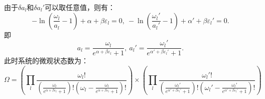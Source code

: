 \documentclass[a4paper,12pt]{article}
\begin{document}
由于$\delta a_l$和$\delta a_l'$可以取任意值，则有：
\begin{equation}\nonumber
	-\ln \left( \frac{\omega_l}{a_l} - 1 \right) + \alpha + \beta\varepsilon_l = 0, ~ -\ln \left( \frac{\omega_l'}{a_l'} - 1 \right) + \alpha' + \beta \varepsilon_l' = 0.
\end{equation}
即
\begin{equation}\nonumber
	a_l = \frac{\omega_l}{e^{\alpha + \beta\varepsilon_l} + 1}, ~ a_l' = \frac{\omega_l'}{e^{\alpha' + \beta \varepsilon_l'} + 1}.
\end{equation}
此时系统的微观状态数为：
\begin{equation}\nonumber
	\Omega = \left( \prod_l \frac{\omega_l!}{(\frac{\omega_l}{e^{\alpha+\beta\varepsilon_l}+1})!(\omega_l - \frac{\omega_l}{e^{\alpha+\beta\varepsilon_l}+1})!} \right) \times \left( \prod_l \frac{\omega_l'!}{(\frac{\omega_l'}{e^{\alpha'+\beta\varepsilon_l'}+1})!(\omega_l' - \frac{\omega_l'}{e^{\alpha'+\beta\varepsilon_l'}+1})!} \right)
\end{equation}
\end{document}
